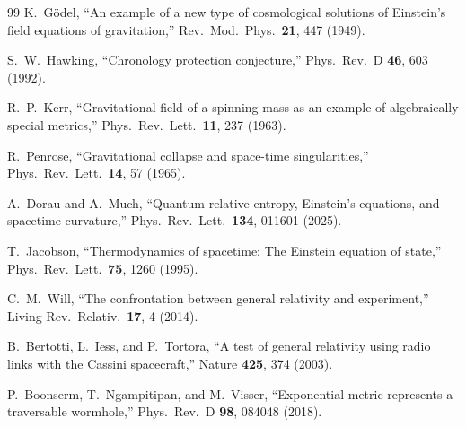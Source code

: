 \documentclass[12pt]{article}
\begin{document}
\begin{thebibliography}{99}
K.~G\"odel,
``An example of a new type of cosmological solutions of Einstein's field
equations of gravitation,''
Rev.\ Mod.\ Phys.\ \textbf{21}, 447 (1949).

S.~W.~Hawking,
``Chronology protection conjecture,''
Phys.\ Rev.\ D \textbf{46}, 603 (1992).

R.~P.~Kerr,
``Gravitational field of a spinning mass as an example of algebraically
special metrics,''
Phys.\ Rev.\ Lett.\ \textbf{11}, 237 (1963).

R.~Penrose,
``Gravitational collapse and space-time singularities,''
Phys.\ Rev.\ Lett.\ \textbf{14}, 57 (1965).

A.~Dorau and A.~Much,
``Quantum relative entropy, Einstein's equations, and spacetime curvature,''
Phys.\ Rev.\ Lett.\ \textbf{134}, 011601 (2025).

T.~Jacobson,
``Thermodynamics of spacetime: The Einstein equation of state,''
Phys.\ Rev.\ Lett.\ \textbf{75}, 1260 (1995).

C.~M.~Will,
``The confrontation between general relativity and experiment,''
Living Rev.\ Relativ.\ \textbf{17}, 4 (2014).

B.~Bertotti, L.~Iess, and P.~Tortora,
``A test of general relativity using radio links with the Cassini spacecraft,''
Nature \textbf{425}, 374 (2003).

P.~Boonserm, T.~Ngampitipan, and M.~Visser,
``Exponential metric represents a traversable wormhole,''
Phys.\ Rev.\ D \textbf{98}, 084048 (2018).

\end{thebibliography}
\endgroup
\end{document}

